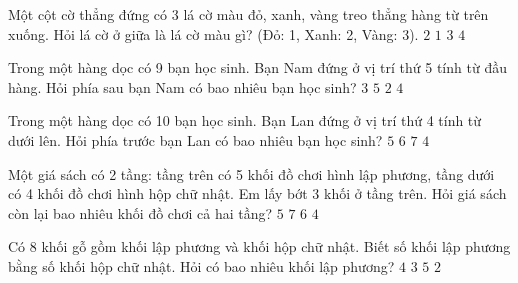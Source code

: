 \begin{ex} %
Một cột cờ thẳng đứng có 3 lá cờ màu đỏ, xanh, vàng treo thẳng hàng từ trên xuống. Hỏi lá cờ ở giữa là lá cờ màu gì? (Đỏ: 1, Xanh: 2, Vàng: 3).
\choice
{\True $2$}
{$1$}
{$3$}
{$4$}
\end{ex}

\begin{ex} %
Trong một hàng dọc có 9 bạn học sinh. Bạn Nam đứng ở vị trí thứ 5 tính từ đầu hàng. Hỏi phía sau bạn Nam có bao nhiêu bạn học sinh?
\choice
{$3$}
{$5$}
{$2$}
{\True $4$}
\end{ex}

\begin{ex} %
Trong một hàng dọc có 10 bạn học sinh. Bạn Lan đứng ở vị trí thứ 4 tính từ dưới lên. Hỏi phía trước bạn Lan có bao nhiêu bạn học sinh?
\choice
{$5$}
{\True $6$}
{$7$}
{$4$}
\end{ex}

\begin{ex} %
Một giá sách có 2 tầng: tầng trên có 5 khối đồ chơi hình lập phương, tầng dưới có 4 khối đồ chơi hình hộp chữ nhật. Em lấy bớt 3 khối ở tầng trên. Hỏi giá sách còn lại bao nhiêu khối đồ chơi cả hai tầng?
\choice
{$5$}
{$7$}
{\True $6$}
{$4$}
\end{ex}

\begin{ex} %
Có 8 khối gỗ gồm khối lập phương và khối hộp chữ nhật. Biết số khối lập phương bằng số khối hộp chữ nhật. Hỏi có bao nhiêu khối lập phương?
\choice
{\True $4$}
{$3$}
{$5$}
{$2$}
\end{ex}

